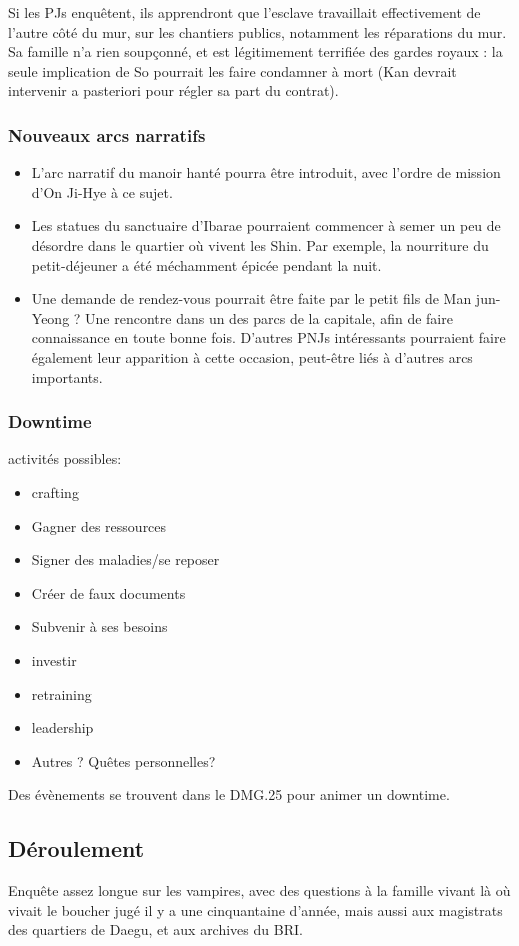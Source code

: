 \documentclass[10pt,a4paper]{book}
\begin{document}
Si les PJs enquêtent, ils apprendront que l'esclave travaillait effectivement de l'autre côté du mur, sur les chantiers publics, notamment les réparations du mur. Sa famille n'a rien soupçonné, et est légitimement terrifiée des gardes royaux : la seule implication de So pourrait les faire condamner à mort (Kan devrait intervenir a pasteriori pour régler sa part du contrat).

\subsubsection{Nouveaux arcs narratifs}
\begin{itemize}
\item L'arc narratif du manoir hanté pourra être introduit, avec l'ordre de mission d'On Ji-Hye à ce sujet.
\item Les statues du sanctuaire d'Ibarae pourraient commencer à semer un peu de désordre dans le quartier où vivent les Shin. Par exemple, la nourriture du petit-déjeuner a été méchamment épicée pendant la nuit.
\item Une demande de rendez-vous pourrait être faite par le petit fils de Man jun-Yeong ? Une rencontre dans un des parcs de la capitale, afin de faire connaissance en toute bonne fois. D'autres PNJs intéressants pourraient faire également leur apparition à cette occasion, peut-être liés à d'autres arcs importants.
\end{itemize}
\subsubsection{Downtime}
activités possibles:
\begin{itemize}
\item crafting
\item Gagner des ressources
\item Signer des maladies/se reposer
\item Créer de faux documents
\item Subvenir à ses besoins
\item investir
\item retraining
\item leadership
\item Autres ? Quêtes personnelles?
\end{itemize}
Des évènements se trouvent dans le DMG.25 pour animer un downtime.
\subsection{Déroulement}
Enquête assez longue sur les vampires, avec des questions à la famille vivant là où vivait le boucher jugé il y a une cinquantaine d'année, mais aussi aux magistrats des quartiers de Daegu, et aux archives du BRI.
\end{document}

